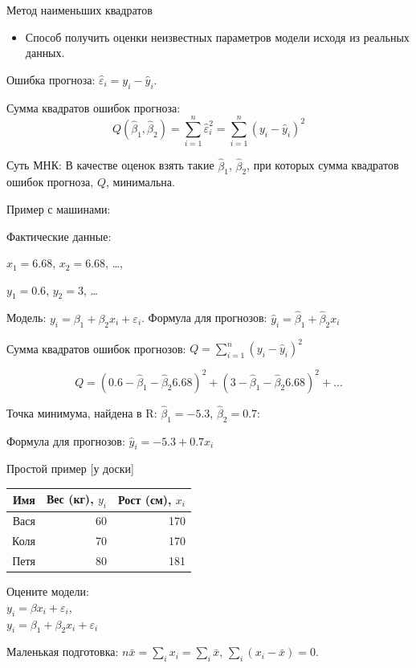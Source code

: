 \documentclass[ignorenonframetext,]{beamer}
\begin{document}
\begin{frame}{Метод наименьших квадратов}

\begin{itemize}
\itemsep1pt\parskip0pt
\item
  Способ получить оценки неизвестных параметров модели исходя из
  реальных данных.
\end{itemize}

Ошибка прогноза: \(\hat{\varepsilon}_i=y_i-\hat{y}_i\).

Сумма квадратов ошибок прогноза: \[
Q(\hat{\beta}_1,\hat{\beta}_2)=\sum_{i=1}^n \hat{\varepsilon}_i^2=\sum_{i=1}^n (y_i-\hat{y}_i)^2
\]

Суть МНК: В качестве оценок взять такие \(\hat{\beta}_1\),
\(\hat{\beta}_2\), при которых сумма квадратов ошибок прогноза, \(Q\),
минимальна.

\end{frame}

\begin{frame}{Пример с машинами:}

Фактические данные:

\(x_1=6.68\), \(x_2=6.68\), \ldots{},

\(y_1=0.6\), \(y_2=3\), \ldots{}

Модель: \(y_i=\beta_1+\beta_2 x_i+\varepsilon_i\). Формула для
прогнозов: \(\hat{y}_i=\hat{\beta}_1 + \hat{\beta}_2 x_i\)

Сумма квадратов ошибок прогнозов: \(Q=\sum_{i=1}^n (y_i-\hat{y}_i)^2\)

\[
Q=(0.6-\hat{\beta}_1-\hat{\beta}_2 6.68)^2+(3-\hat{\beta}_1-\hat{\beta}_2 6.68)^2+...
\]

Точка минимума, найдена в R: \(\hat{\beta}_1=-5.3\),
\(\hat{\beta}_2=0.7\):

Формула для прогнозов: \(\hat{y}_i=-5.3 + 0.7 x_i\)

\end{frame}

\begin{frame}{Простой пример {[}у доски{]}}

\begin{longtable}[c]{@{}rrr@{}}
\toprule
Имя & Вес (кг), \(y_i\) & Рост (см), \(x_i\)\tabularnewline
\midrule
\endhead
Вася & 60 & 170\tabularnewline
Коля & 70 & 170\tabularnewline
Петя & 80 & 181\tabularnewline
\bottomrule
\end{longtable}

Оцените
модели:\\\(y_i=\beta x_i +\varepsilon_i\),\\\(y_i=\beta_1+\beta_2 x_i +\varepsilon_i\)

Маленькая подготовка: \(n\bar{x}=\sum_i x_i=\sum_i \bar{x}\),
\(\sum_i (x_i - \bar{x})=0\).

\end{frame}
\end{document}
